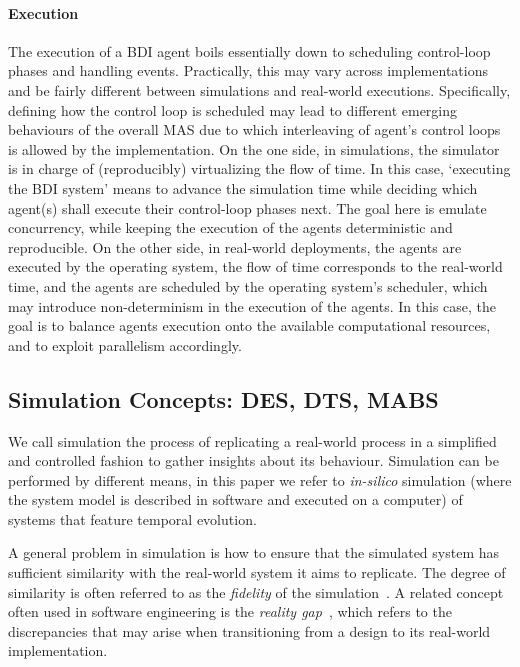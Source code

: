 \paragraph{Execution}

The execution of a \ac{BDI} agent boils essentially down to scheduling control-loop phases
and handling events.
%
Practically,
this may vary across implementations
and be fairly different between simulations and real-world executions.
%
Specifically, defining how the control loop is scheduled
may lead to different emerging behaviours of the overall \ac{MAS} due to
which interleaving of agent's control loops is allowed by the implementation.
%
On the one side,
in simulations,
the simulator is in charge of (reproducibly) virtualizing the flow of time.
%
In this case,
`executing the \ac{BDI} system' means to advance the simulation time
while deciding which agent(s) shall execute their control-loop phases next.
%
The goal here is emulate concurrency, while keeping the execution of the agents deterministic and reproducible.
%
On the other side,
in real-world deployments,
the agents are executed by the operating system,
the flow of time corresponds to the real-world time,
and the agents are scheduled by the operating system's scheduler,
which may introduce non-determinism in the execution of the agents.
%
In this case,
the goal is to balance agents execution onto the available computational resources,
and to exploit parallelism accordingly.


\subsection{Simulation Concepts: \acs{DES}, \acs{DTS}, \acs{MABS}}
\label{subsec:simulation:discrete-simulation}

We call simulation the process of replicating a real-world process
in a simplified and controlled fashion to gather insights about its behaviour.
%
Simulation can be performed by different means,
in this paper we refer to \emph{in-silico} simulation
(where the system model is described in software and executed on a computer)
of systems that feature temporal evolution.

A general problem in simulation is how to ensure that the simulated system has
sufficient similarity with the real-world system it aims to replicate.
%
The degree of similarity is often referred to as the
\emph{fidelity} of the simulation~\cite{DBLP:conf/wsc/MoonH13}.
%
A related concept often used in software engineering
is the \emph{reality gap}~\cite{DBLP:conf/ecal/JacobiHH95}, which
refers to the discrepancies that may arise when transitioning
from a design to its real-world implementation.

